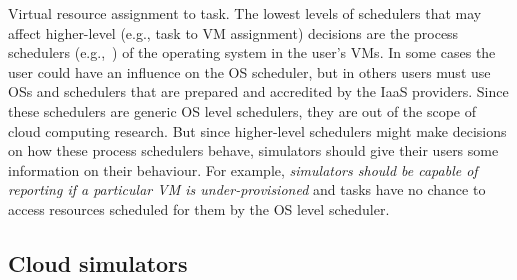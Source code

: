 \documentclass[sort, compress, 5p]{elsarticle}
\begin{document}
\begin{description*}
\item[Virtual resource assignment to task.] The lowest levels of schedulers that may affect higher-level (e.g., task to VM assignment) decisions are the process schedulers (e.g.,~\cite{Wong:2008:TAF:1400097.1400102, 4510751}) of the operating system in the user's VMs. In some cases the user could have an influence on the OS scheduler, but in others users must use OSs and schedulers that are prepared and accredited by the IaaS providers. Since these schedulers are generic OS level schedulers, they are out of the scope of cloud computing research. But since higher-level schedulers might make decisions on how these process schedulers behave, simulators should give their users some information on their behaviour. For example, \emph{simulators should be capable of reporting if a particular VM is under-provisioned} and tasks have no chance to access resources scheduled for them by the OS level scheduler.
\end{description*}

\subsection{Cloud simulators}
\end{document}

